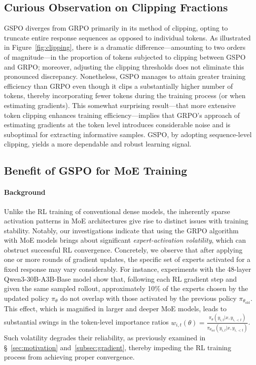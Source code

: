 \subsection{Curious Observation on Clipping Fractions}

GSPO diverges from GRPO primarily in its method of clipping, opting to truncate entire response sequences as opposed to individual tokens. As illustrated in Figure~\ref{fig:clipping}, there is a dramatic difference—amounting to two orders of magnitude—in the proportion of tokens subjected to clipping between GSPO and GRPO; moreover, adjusting the clipping thresholds does not eliminate this pronounced discrepancy. Nonetheless, GSPO manages to attain greater training efficiency than GRPO even though it clips a substantially higher number of tokens, thereby incorporating fewer tokens during the training process (or when estimating gradients). This somewhat surprising result—that more extensive token clipping enhances training efficiency—implies that GRPO’s approach of estimating gradients at the token level introduces considerable noise and is suboptimal for extracting informative samples. GSPO, by adopting sequence-level clipping, yields a more dependable and robust learning signal.

\subsection{Benefit of GSPO for MoE Training}
\label{subsec:routing_replay}

\paragraph{Background}
Unlike the RL training of conventional dense models, the inherently sparse activation patterns in MoE architectures give rise to distinct issues with training stability. Notably, our investigations indicate that using the GRPO algorithm with MoE models brings about significant \textit{expert-activation volatility}, which can obstruct successful RL convergence. Concretely, we observe that after applying one or more rounds of gradient updates, the specific set of experts activated for a fixed response may vary considerably. For instance, experiments with the 48-layer Qwen3-30B-A3B-Base model show that, following each RL gradient step and given the same sampled rollout, approximately 10\% of the experts chosen by the updated policy $\pi_{\theta}$ do not overlap with those activated by the previous policy $\pi_{\theta_\text{old}}$.
This effect, which is magnified in larger and deeper MoE models, leads to substantial swings in the token-level importance ratios $w_{i,t}(\theta) = \frac{ \pi_{\theta} (y_{i,t} | x, y_{i,<t}) }{ \pi_{\theta_\text{old}} (y_{i,t} | x,y_{i,<t})}$. Such volatility degrades their reliability, as previously examined in \S~\ref{sec:motivation} and~\ref{subsec:gradient}, thereby impeding the RL training process from achieving proper convergence.

